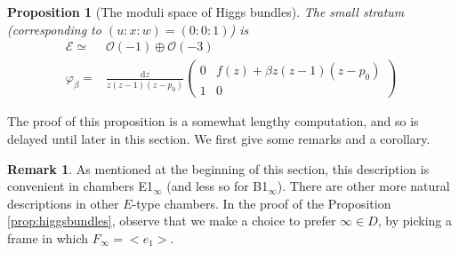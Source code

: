 \documentclass[12pt,letterpaper,reqno]{amsart}
\newtheorem{prop}[thm]{Proposition}
\theoremstyle{remark}
\theoremstyle{definition}
\newtheorem{rem}[thm]{Remark}
\numberwithin{thm}{section}
\numberwithin{equation}{section}
\numberwithin{figure}{section}
\newcommand{\cO}{\ensuremath{\mathcal O}}
\newcommand{\cE}{{\mathcal E}}
\newcommand{\de}{\mathrm{d}}
\begin{document}
\begin{prop}[The moduli space of Higgs bundles]
The small stratum (corresponding to $(u:x:w)=(0:0:1)$) is
\begin{align}\label{eq:smallstrata}
 \cE \simeq&  \cO(-1) \oplus \cO(-3) \\ \nonumber
 \varphi_\beta  =& \frac{\de z}{z(z-1)(z-p_0)}\begin{pmatrix} 0 & f(z) + \beta z (z-1)(z-p_0) \\ 1 & 0 \end{pmatrix} 
\end{align}
\end{prop}

The proof of this proposition is a somewhat lengthy computation, and so is delayed until later in this section.  
We first give some remarks and a corollary.

\begin{rem}\label{rem:preference} As mentioned at the beginning of this section, this description is convenient in chambers E1$_\infty$ (and less so for B1$_\infty$). There are other more natural descriptions in other $E$-type chambers. In the proof of the  Proposition \ref{prop:higgsbundles}, observe that we make a choice to prefer $\infty \in D$, by picking a frame in which $F_\infty=<e_1>$.
 \end{rem}
\end{document}
